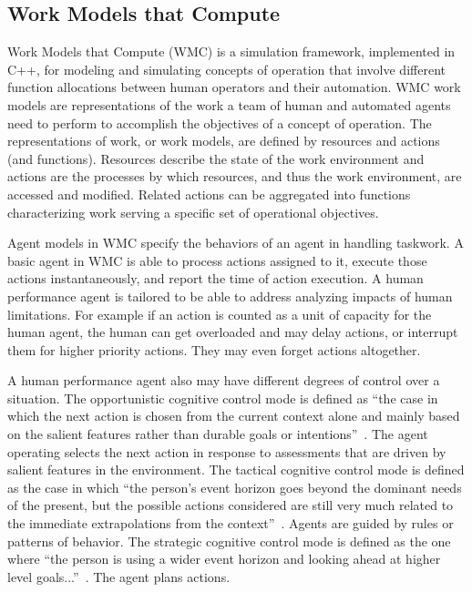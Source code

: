 \documentclass[journal]{IEEEtran}
\begin{document}
\subsection{Work Models that Compute}


Work Models that Compute (WMC) is a simulation framework, implemented in C++, for modeling and simulating concepts of operation that involve different function allocations between human operators and their automation. 
WMC work models are representations of the work a team of human and automated agents need to perform to accomplish the objectives of a concept of operation. The representations of work, or work models, are defined by resources and actions (and functions). Resources describe
the state of the work environment and actions
are the processes by which resources, and thus
the work environment, are accessed and
modified. Related actions can be aggregated into functions characterizing work serving a specific set of operational objectives.

Agent models in WMC specify the behaviors of an agent in handling taskwork. A basic agent in WMC is able to process actions assigned to it, execute those actions instantaneously, and report the time of action execution. A human performance agent is tailored to be able to address analyzing impacts of human limitations. For example if an action is counted as a unit of capacity for the human agent, the human can get overloaded and may delay actions, or interrupt them for higher priority actions. They may even forget actions altogether.

A human performance agent also may have different degrees of control over a situation. The opportunistic cognitive control mode is defined as ``the case in which the next action is chosen from the current context alone and mainly based on the salient features rather than durable goals or intentions''~\cite{Hollnagel1993}. The agent operating selects the next action in response to assessments that are driven by salient features in the environment. The tactical cognitive control mode is defined as the case in which ``the person’s event horizon goes beyond the dominant needs of the present, but the possible actions considered are still very much related to the immediate extrapolations from the context''~\cite[p170]{Hollnagel1993}. Agents are guided by rules or patterns of behavior. The strategic cognitive control mode is defined as the one where ``the person is using a wider event horizon and looking ahead at higher level goals...''~\cite{Hollnagel1993}. The agent plans actions.
\end{document}
